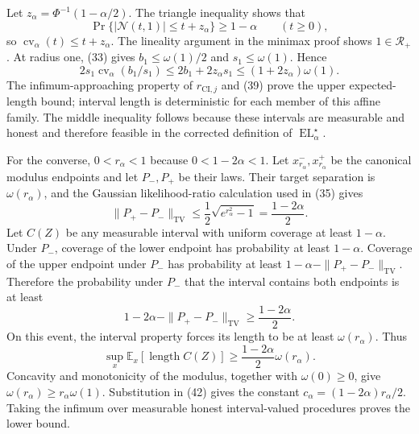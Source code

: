 Let \(z_\alpha=\Phi^{-1}(1-\alpha/2)\).  The triangle inequality shows that
\[
 \Pr\{|\mathcal N(t,1)|\le t+z_\alpha\}\ge1-\alpha
 \qquad(t\ge0),
\]
so \(\operatorname{cv}_\alpha(t)\le t+z_\alpha\).  The lineality argument in the minimax proof shows \(1\in\mathcal R_+\).  At radius one, (33) gives \(b_1\le\omega(1)/2\) and \(s_1\le\omega(1)\).  Hence
\[
 2s_1\operatorname{cv}_\alpha(b_1/s_1)
 \le2b_1+2z_\alpha s_1
 \le(1+2z_\alpha)\omega(1).                                    \tag{39}
\]
The infimum-approaching property of \(r_{\mathrm{CI},j}\) and (39) prove the upper expected-length bound; interval length is deterministic for each member of this affine family.  The middle inequality follows because these intervals are measurable and honest and therefore feasible in the corrected definition of \(\operatorname{EL}^{\star}_\alpha\).

For the converse, \(0<r_\alpha<1\) because \(0<1-2\alpha<1\).  Let \(x^-_{r_\alpha},x^+_{r_\alpha}\) be the canonical modulus endpoints and let \(P_-,P_+\) be their laws.  Their target separation is \(\omega(r_\alpha)\), and the Gaussian likelihood-ratio calculation used in (35) gives
\[
 \|P_+-P_-\|_{\mathrm{TV}}
 \le\frac12\sqrt{e^{r_\alpha^2}-1}
 =\frac{1-2\alpha}{2}.                                         \tag{40}
\]
Let \(C(Z)\) be any measurable interval with uniform coverage at least \(1-\alpha\).  Under \(P_-\), coverage of the lower endpoint has probability at least \(1-\alpha\).  Coverage of the upper endpoint under \(P_-\) has probability at least \(1-\alpha-\|P_+-P_-\|_{\mathrm{TV}}\).  Therefore the probability under \(P_-\) that the interval contains both endpoints is at least
\[
 1-2\alpha-\|P_+-P_-\|_{\mathrm{TV}}
 \ge\frac{1-2\alpha}{2}.                                       \tag{41}
\]
On this event, the interval property forces its length to be at least \(\omega(r_\alpha)\).  Thus
\[
 \sup_x\mathbb E_x[\operatorname{length}C(Z)]
 \ge\frac{1-2\alpha}{2}\omega(r_\alpha).                       \tag{42}
\]
Concavity and monotonicity of the modulus, together with \(\omega(0)\ge0\), give \(\omega(r_\alpha)\ge r_\alpha\omega(1)\).  Substitution in (42) gives the constant \(c_\alpha=(1-2\alpha)r_\alpha/2\).  Taking the infimum over measurable honest interval-valued procedures proves the lower bound.
